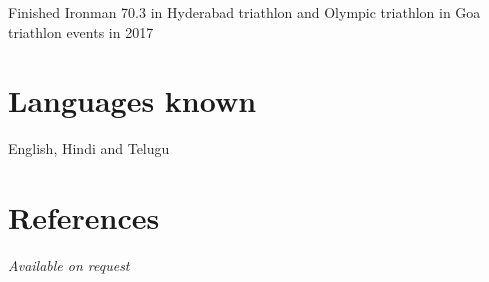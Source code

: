 \documentclass[line]{resume}
\begin{document}
{\begin{resume}
\begin{list2}
				\item Finished Ironman 70.3 in Hyderabad triathlon and Olympic triathlon in Goa triathlon events in 2017
				
				
		\end{list2}
	
				\section{\mysidestyle Languages known}
				English, Hindi and Telugu 
			
			\section{\mysidestyle References} 
        \textsl{Available on request}  
				
				

\end{resume}}
\end{document}
